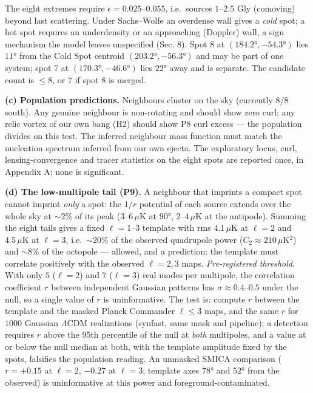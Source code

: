 \documentclass[
]{article}
\begin{document}
The eight extremes require \(\epsilon = 0.025\)--\(0.055\), i.e.~sources
\(1\)--\(2.5\) Gly (comoving) beyond last scattering. Under Sachs--Wolfe
an overdense wall gives a \emph{cold} spot; a hot spot requires an
underdensity or an approaching (Doppler) wall, a sign mechanism the
model leaves unspecified (Sec. 8). Spot 8 at \((184.2°, -54.3°)\) lies
\(11°\) from the Cold Spot centroid \((203.2°, -56.3°)\) and may be part
of one system; spot 7 at \((170.3°, -46.6°)\) lies \(22°\) away and is
separate. The candidate count is \(\leq 8\), or \(7\) if spot 8 is
merged.

\textbf{(c) Population predictions.} Neighbours cluster on the sky
(currently \(8/8\) south). Any genuine neighbour is non-rotating and
should show zero curl; any relic vortex of our own bang (H2) should show
P8 curl excess --- the population divides on this test. The inferred
neighbour mass function must match the nucleation spectrum inferred from
our own ejecta. The exploratory locus, curl, lensing-convergence and
tracer statistics on the eight spots are reported once, in Appendix A;
none is significant.

\textbf{(d) The low-multipole tail (P9).} A neighbour that imprints a
compact spot cannot imprint \emph{only} a spot: the \(1/r\) potential of
each source extends over the whole sky at \(\sim\!2\%\) of its peak
(\(3\)--\(6\,\mu\)K at \(90°\), \(2\)--\(4\,\mu\)K at the antipode).
Summing the eight tails gives a fixed \(\ell = 1\)--\(3\) template with
rms \(4.1\,\mu\)K at \(\ell=2\) and \(4.5\,\mu\)K at \(\ell=3\),
i.e.~\(\sim\!20\%\) of the observed quadrupole power
(\(C_2 \approx 210\,\mu\)K\(^2\)) and \(\sim\!8\%\) of the octopole ---
allowed, and a prediction: the template must correlate positively with
the observed \(\ell = 2, 3\) maps. \emph{Pre-registered threshold.} With
only \(5\) (\(\ell=2\)) and \(7\) (\(\ell=3\)) real modes per multipole,
the correlation coefficient \(r\) between independent Gaussian patterns
has \(\sigma \approx 0.4\)--\(0.5\) under the null, so a single value of
\(r\) is uninformative. The test is: compute \(r\) between the template
and the masked Planck Commander \(\ell \le 3\) maps, and the same \(r\)
for \(1000\) Gaussian \(\Lambda\)CDM realizations (synfast, same mask
and pipeline); a detection requires \(r\) above the 95th percentile of
the null at \emph{both} multipoles, and a value at or below the null
median at both, with the template amplitude fixed by the spots,
falsifies the population reading. An unmasked SMICA comparison
(\(r = +0.15\) at \(\ell=2\), \(-0.27\) at \(\ell=3\); template axes
\(78°\) and \(52°\) from the observed) is uninformative at this power
and foreground-contaminated.
\end{document}
